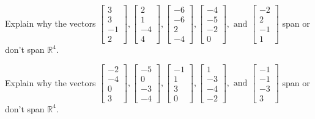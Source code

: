 \documentclass{article}
\begin{document}
\begin{exerciseStatement}
    Explain why the vectors \(\left[\begin{array}{r}
3 \\
3 \\
-1 \\
2
\end{array}\right] , \left[\begin{array}{r}
2 \\
1 \\
-4 \\
4
\end{array}\right] , \left[\begin{array}{r}
-6 \\
-6 \\
2 \\
-4
\end{array}\right] , \left[\begin{array}{r}
-4 \\
-5 \\
-2 \\
0
\end{array}\right] , \text{ and } \left[\begin{array}{r}
-2 \\
2 \\
-1 \\
1
\end{array}\right]\) span or don't span \(\mathbb{R}^4\).



  
\end{exerciseStatement}

\begin{exerciseStatement}
    Explain why the vectors \(\left[\begin{array}{r}
-2 \\
-4 \\
0 \\
3
\end{array}\right] , \left[\begin{array}{r}
-5 \\
0 \\
-3 \\
-4
\end{array}\right] , \left[\begin{array}{r}
-1 \\
1 \\
3 \\
0
\end{array}\right] , \left[\begin{array}{r}
1 \\
-3 \\
-4 \\
-2
\end{array}\right] , \text{ and } \left[\begin{array}{r}
-1 \\
-1 \\
-3 \\
3
\end{array}\right]\) span or don't span \(\mathbb{R}^4\).



  
\end{exerciseStatement}
\end{document}
